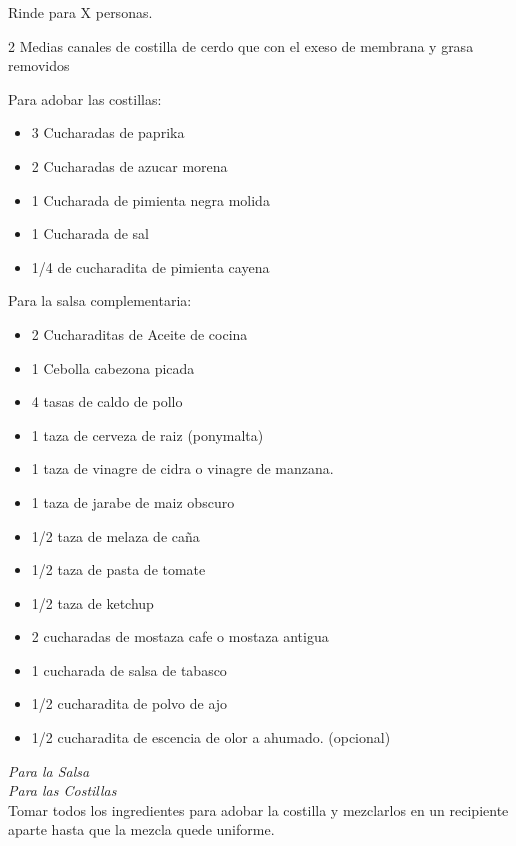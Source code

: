 
Rinde para X personas.


\begin{ingredientes}
\item 2 Medias canales de costilla de cerdo que con el exeso de membrana y grasa removidos
\item Para adobar las costillas:
\begin{itemize}
\item 3 Cucharadas de paprika
\item 2 Cucharadas de azucar morena
\item 1 Cucharada de pimienta negra molida
\item 1 Cucharada de sal
\item 1/4 de cucharadita de pimienta cayena
\end{itemize}
\item Para la salsa complementaria:
\begin{itemize}
\item 2 Cucharaditas de Aceite de cocina
\item 1 Cebolla cabezona picada
\item 4 tasas de caldo de pollo
\item 1 taza de cerveza de raiz (ponymalta)
\item 1 taza de vinagre de cidra o vinagre de manzana.
\item 1 taza de jarabe de maiz obscuro
\item 1/2 taza de melaza de caña
\item 1/2 taza de pasta de tomate
\item 1/2 taza de ketchup
\item 2 cucharadas de mostaza cafe o mostaza antigua
\item 1 cucharada de salsa de tabasco
\item 1/2 cucharadita de polvo de ajo
\item 1/2 cucharadita de escencia de olor a ahumado. (opcional)
\end{itemize}
\end{ingredientes}
\preparacion

\emph{Para la Salsa}\\


\emph{Para las Costillas}\\

Tomar todos los ingredientes para adobar la costilla y mezclarlos en un recipiente aparte hasta que la mezcla quede uniforme.\\


